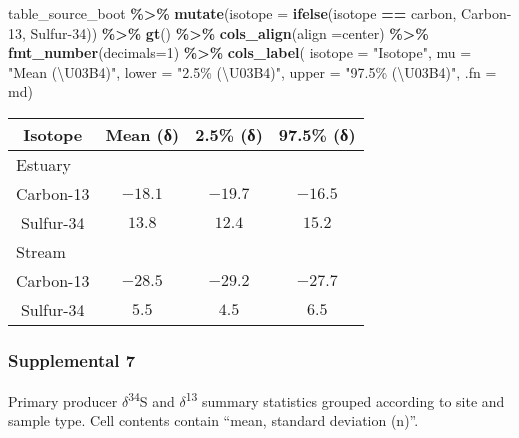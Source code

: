 \documentclass[
]{article}
\newenvironment{Shaded}{\begin{snugshade}}{\end{snugshade}}
\newcommand{\AttributeTok}[1]{\textcolor[rgb]{0.13,0.29,0.53}{#1}}
\newcommand{\DecValTok}[1]{\textcolor[rgb]{0.00,0.00,0.81}{#1}}
\newcommand{\FunctionTok}[1]{\textcolor[rgb]{0.13,0.29,0.53}{\textbf{#1}}}
\newcommand{\NormalTok}[1]{#1}
\newcommand{\SpecialCharTok}[1]{\textcolor[rgb]{0.81,0.36,0.00}{\textbf{#1}}}
\newcommand{\StringTok}[1]{\textcolor[rgb]{0.31,0.60,0.02}{#1}}
\begin{document}
\begin{Shaded}
\begin{Highlighting}[]
\NormalTok{table\_source\_boot }\SpecialCharTok{\%\textgreater{}\%}
  \FunctionTok{mutate}\NormalTok{(}\AttributeTok{isotope =} \FunctionTok{ifelse}\NormalTok{(isotope }\SpecialCharTok{==} \StringTok{\textquotesingle{}carbon\textquotesingle{}}\NormalTok{, }\StringTok{\textquotesingle{}Carbon{-}13\textquotesingle{}}\NormalTok{, }\StringTok{\textquotesingle{}Sulfur{-}34\textquotesingle{}}\NormalTok{)) }\SpecialCharTok{\%\textgreater{}\%}
  \FunctionTok{gt}\NormalTok{() }\SpecialCharTok{\%\textgreater{}\%}
  \FunctionTok{cols\_align}\NormalTok{(}\AttributeTok{align =}\StringTok{\textquotesingle{}center\textquotesingle{}}\NormalTok{) }\SpecialCharTok{\%\textgreater{}\%} 
  \FunctionTok{fmt\_number}\NormalTok{(}\AttributeTok{decimals=}\DecValTok{1}\NormalTok{) }\SpecialCharTok{\%\textgreater{}\%}
  \FunctionTok{cols\_label}\NormalTok{(}
    \AttributeTok{isotope =} \StringTok{"Isotope"}\NormalTok{,}
    \AttributeTok{mu =} \StringTok{"Mean (\textbackslash{}U03B4)"}\NormalTok{,}
    \AttributeTok{lower =} \StringTok{"2.5\% (\textbackslash{}U03B4)"}\NormalTok{,}
    \AttributeTok{upper =} \StringTok{"97.5\% (\textbackslash{}U03B4)"}\NormalTok{,}
    \AttributeTok{.fn =}\NormalTok{ md)}
\end{Highlighting}
\end{Shaded}

\begin{longtable}{cccc}
\toprule
Isotope & Mean (δ) & 2.5\% (δ) & 97.5\% (δ) \\ 
\midrule
\multicolumn{4}{l}{Estuary} \\ 
\midrule
Carbon-13 & $-18.1$ & $-19.7$ & $-16.5$ \\ 
Sulfur-34 & $13.8$ & $12.4$ & $15.2$ \\ 
\midrule
\multicolumn{4}{l}{Stream} \\ 
\midrule
Carbon-13 & $-28.5$ & $-29.2$ & $-27.7$ \\ 
Sulfur-34 & $5.5$ & $4.5$ & $6.5$ \\ 
\bottomrule
\end{longtable}

\newpage

\hypertarget{supplemental-7}{%
\subsubsection{Supplemental 7}\label{supplemental-7}}

Primary producer \(\delta\)\textsuperscript{34}S and
\(\delta\)\textsuperscript{13} summary statistics grouped according to
site and sample type. Cell contents contain ``mean, standard deviation
(n)''.
\end{document}
